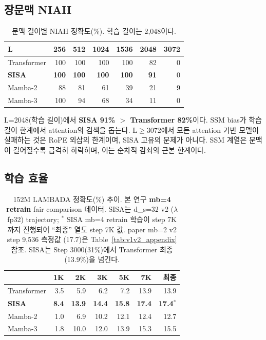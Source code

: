 \documentclass[11pt]{article}
\begin{document}
\subsection{장문맥 NIAH}

\begin{table}[h]
\centering
\caption{문맥 길이별 NIAH 정확도(\%). 학습 길이는 2,048이다.}
\label{tab:long_niah}
\begin{tabular}{lrrrrrr}
\toprule
\textbf{L} & \textbf{256} & \textbf{512} & \textbf{1024} & \textbf{1536} & \textbf{2048} & \textbf{3072} \\
\midrule
Transformer & 100 & 100 & 100 & 100 & 82 & 0 \\
\textbf{SISA} & \textbf{100} & \textbf{100} & \textbf{100} & \textbf{100} & \textbf{91} & 0 \\
Mamba-2 & 88 & 81 & 61 & 39 & 21 & 9 \\
Mamba-3 & 100 & 94 & 68 & 34 & 11 & 0 \\
\bottomrule
\end{tabular}
\end{table}

L=2048(학습 길이)에서 \textbf{SISA 91\% $>$ Transformer 82\%}이다. SSM bias가 학습 길이 한계에서 attention의 검색을 돕는다. L$\geq$3072에서 모든 attention 기반 모델이 실패하는 것은 RoPE 외삽의 한계이며, SISA 고유의 문제가 아니다. SSM 계열은 문맥이 길어질수록 급격히 하락하며, 이는 순차적 감쇠의 근본 한계이다.

\subsection{학습 효율}

\begin{table}[h]
\centering
\caption{152M LAMBADA 정확도(\%) 추이. 본 연구 \textbf{mb=4 retrain} fair comparison 데이터. SISA는 d_s=32 v2 ($\lambda$ fp32) trajectory; $^*$ SISA mb=4 retrain 학습이 step 7K까지 진행되어 ``최종'' 열도 step 7K 값. paper mb=2 v2 step 9,536 측정값 (17.7)은 Table~\ref{tab:v1v2_appendix} 참조. SISA는 Step 3000(31\%)에서 Transformer 최종(13.9\%)을 넘긴다.}
\label{tab:efficiency}
\begin{tabular}{lrrrrrr}
\toprule
& \textbf{1K} & \textbf{2K} & \textbf{3K} & \textbf{5K} & \textbf{7K} & \textbf{최종} \\
\midrule
Transformer & 3.5 & 5.9 & 6.2 & 7.2 & 13.9 & 13.9 \\
\textbf{SISA} & \textbf{8.4} & \textbf{13.9} & \textbf{14.4} & \textbf{15.8} & \textbf{17.4} & \textbf{17.4}$^*$ \\
Mamba-2 & 1.0 & 6.9 & 10.2 & 12.1 & 12.4 & 12.7 \\
Mamba-3 & 1.8 & 10.0 & 12.0 & 13.9 & 15.3 & 15.5 \\
\bottomrule
\end{tabular}
\end{table}
\end{document}
